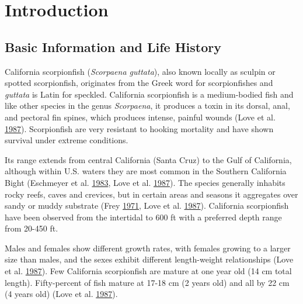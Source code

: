 \documentclass[12pt,]{article}
\begin{document}
\FloatBarrier

\newpage

\renewcommand{\thefigure}{\arabic{figure}}
\renewcommand{\thetable}{\arabic{table}}

\setcounter{figure}{0} \setcounter{table}{0}

\section{Introduction}\label{introduction}

\subsection{Basic Information and Life
History}\label{basic-information-and-life-history}

California scorpionfish (\emph{Scorpaena guttata}), also known locally
as sculpin or spotted scorpionfish, originates from the Greek word for
scorpionfishes and \emph{guttata} is Latin for speckled. California
scorpionfish is a medium-bodied fish and like other species in the genus
\emph{Scorpaena}, it produces a toxin in its dorsal, anal, and pectoral
fin spines, which produces intense, painful wounds (Love et al.
\protect\hyperlink{ref-Love1987}{1987}). Scorpionfish are very resistant
to hooking mortality and have shown survival under extreme conditions.

Its range extends from central California (Santa Cruz) to the Gulf of
California, although within U.S. waters they are most common in the
Southern California Bight (Eschmeyer et al.
\protect\hyperlink{ref-Eschmeyer1983}{1983}, Love et al.
\protect\hyperlink{ref-Love1987}{1987}). The species generally inhabits
rocky reefs, caves and crevices, but in certain areas and seasons it
aggregates over sandy or muddy substrate (Frey
\protect\hyperlink{ref-Frey1971}{1971}, Love et al.
\protect\hyperlink{ref-Love1987}{1987}). California scorpionfish have
been observed from the intertidal to 600 ft with a preferred depth range
from 20-450 ft.

Males and females show different growth rates, with females growing to a
larger size than males, and the sexes exhibit different length-weight
relationships (Love et al. \protect\hyperlink{ref-Love1987}{1987}). Few
California scorpionfish are mature at one year old (14 cm total length).
Fifty-percent of fish mature at 17-18 cm (2 years old) and all by 22 cm
(4 years old) (Love et al. \protect\hyperlink{ref-Love1987}{1987}).
\end{document}
